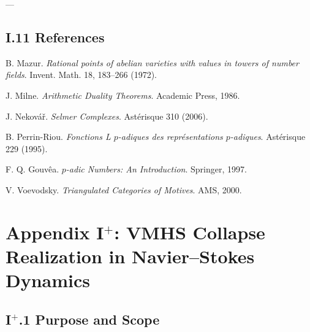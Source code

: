 \documentclass[11pt]{article}
\newcommand{\Sha}{\mathbb{S}}
\begin{document}
\begin{center}
\end{center}

---

\subsection*{I.11 References}

\begin{thebibliography}{9}

B. Mazur.  
\textit{Rational points of abelian varieties with values in towers of number fields}.  
Invent. Math. 18, 183–266 (1972).

J. Milne.  
\textit{Arithmetic Duality Theorems}. Academic Press, 1986.

J. Nekovář.  
\textit{Selmer Complexes}. Astérisque 310 (2006).

B. Perrin-Riou.  
\textit{Fonctions L $p$-adiques des représentations $p$-adiques}. Astérisque 229 (1995).

F. Q. Gouvêa.  
\textit{$p$-adic Numbers: An Introduction}. Springer, 1997.

V. Voevodsky.  
\textit{Triangulated Categories of Motives}. AMS, 2000.

\end{thebibliography}




\section*{Appendix I$^+$: VMHS Collapse Realization in Navier--Stokes Dynamics}

\subsection*{I$^+$.1 Purpose and Scope}
\end{document}
